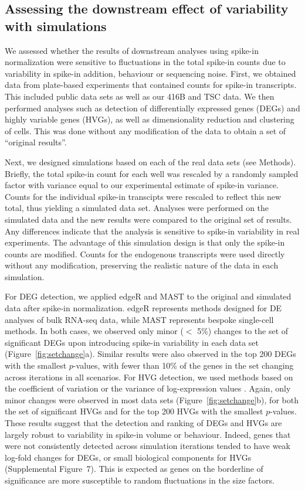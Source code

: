 \documentclass{article}
\newcommand{\suppfiglostsim}{7}
\begin{document}
\subsection*{Assessing the downstream effect of variability with simulations}
We assessed whether the results of downstream analyses using spike-in normalization were sensitive to fluctuations in the total spike-in counts due to variability in spike-in addition, behaviour or sequencing noise.
First, we obtained data from plate-based experiments that contained counts for spike-in transcripts.
This included public data sets \autocite{segerstople2016single,islam2011characterization} as well as our 416B and TSC data.
We then performed analyses such as detection of differentially expressed genes (DEGs) and highly variable genes (HVGs), as well as dimensionality reduction and clustering of cells.
This was done without any modification of the data to obtain a set of ``original results''.

Next, we designed simulations based on each of the real data sets (see Methods).
Briefly, the total spike-in count for each well was rescaled by a randomly sampled factor with variance equal to our experimental estimate of spike-in variance.
Counts for the individual spike-in transcipts were rescaled to reflect this new total, thus yielding a simulated data set.
Analyses were performed on the simulated data and the new results were compared to the original set of results.
Any differences indicate that the analysis is sensitive to spike-in variability in real experiments.
The advantage of this simulation design is that only the spike-in counts are modified.
Counts for the endogenous transcripts were used directly without any modification, preserving the realistic nature of the data in each simulation.

For DEG detection, we applied edgeR \autocite{robinson2010edgeR} and MAST \autocite{finak2015mast} to the original and simulated data after spike-in normalization.
edgeR represents methods designed for DE analyses of bulk RNA-seq data, while MAST represents bespoke single-cell methods.
In both cases, we observed only minor ($<$ 5\%) changes to the set of significant DEGs upon introducing spike-in variability in each data set (Figure~\ref{fig:setchange}a). 
Similar results were also observed in the top 200 DEGs with the smallest $p$-values, with fewer than 10\% of the genes in the set changing across iterations in all scenarios.
For HVG detection, we used methods based on the coefficient of variation \autocite{brennecke2013accounting} or the variance of log-expression values \autocite{lun2016stepbystep}.
Again, only minor changes were observed in most data sets (Figure~\ref{fig:setchange}b), for both the set of significant HVGs and for the top 200 HVGs with the smallest $p$-values.
These results suggest that the detection and ranking of DEGs and HVGs are largely robust to variability in spike-in volume or behaviour.
Indeed, genes that were not consistently detected across simulation iterations tended to have weak log-fold changes for DEGs, or small biological components for HVGs (Supplemental Figure~\suppfiglostsim{}).
This is expected as genes on the borderline of significance are more susceptible to random fluctuations in the size factors.
\end{document}
